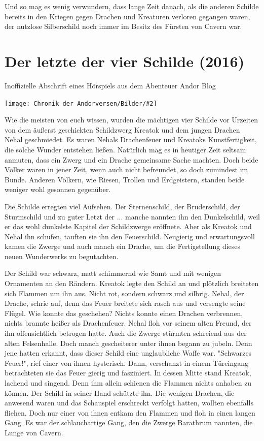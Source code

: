 \documentclass[10pt, a4paper, oneside]{book}
\newcommand{\fillbreak}{\vspace*{\fill}\columnbreak}
\newcommand{\storytext}[1]{%
    \section{#1}%
    \label{Storytext: #1}%
}
\newcommand{\bildmitts}[2][height=0.32\textwidth,width=0.48\textwidth,keepaspectratio]{%
    \begin{center}
        \texttt{[image: Chronik der Andorversen/Bilder/\#2]}
    \end{center}
}
\begin{document}
\begin{multicols}{2}
Und so mag es wenig verwundern, dass lange Zeit danach, als die anderen Schilde bereits in den Kriegen gegen Drachen und Kreaturen verloren gegangen waren, der nutzlose Silberschild noch immer im Besitz des Fürsten von Cavern war.




\fillbreak
\storytext{Der letzte der vier Schilde (2016)}

\begin{center}
    Inoffizielle Abschrift eines Hörspiels aus dem Abenteuer Andor Blog
\end{center}

\bildmitts{Kreatok und Nehal.jpeg}

Wie die meisten von euch wissen, wurden die mächtigen vier Schilde vor Urzeiten von dem äußerst geschickten Schildzwerg Kreatok und dem jungen Drachen Nehal geschmiedet. Es waren Nehals Drachenfeuer und Kreatoks Kunstfertigkeit, die solche Wunder entstehen ließen. Natürlich mag es in heutiger Zeit seltsam anmuten, dass ein Zwerg und ein Drache gemeinsame Sache machten. Doch beide Völker waren in jener Zeit, wenn auch nicht befreundet, so doch zumindest im Bunde. Anderen Völkern, wie Riesen, Trollen und Erdgeistern, standen beide weniger wohl gesonnen gegenüber.

Die Schilde erregten viel Aufsehen. Der Sternenschild, der Bruderschild, der Sturmschild und zu guter Letzt der ... manche nannten ihn den Dunkelschild, weil er das wohl dunkelste Kapitel der Schildzwerge eröffnete. Aber als Kreatok und Nehal ihn schufen, tauften sie ihn den Feuerschild. Neugierig und erwartungsvoll kamen die Zwerge und auch manch ein Drache, um die Fertigstellung dieses neuen Wunderwerks zu begutachten. 

Der Schild war schwarz, matt schimmernd wie Samt und mit wenigen Ornamenten an den Rändern. Kreatok legte den Schild an und plötzlich breiteten sich Flammen um ihn aus. Nicht rot, sondern schwarz und silbrig. Nehal, der Drache, schrie auf, denn das Feuer breitete sich rasch aus und versengte seine Flügel. Wie konnte das geschehen? Nichts konnte einen Drachen verbrennen, nichts brannte heißer als Drachenfeuer. Nehal floh vor seinem alten Freund, der ihn offensichtlich betrogen hatte. Auch die Zwerge stürmten schreiend aus der alten Felsenhalle. Doch manch gescheiterer unter ihnen begann zu jubeln. Denn jene hatten erkannt, dass dieser Schild eine unglaubliche Waffe war. "Schwarzes Feuer!", rief einer von ihnen hysterisch. Dann, verschanzt in einem Türeingang betrachteten sie das Feuer gierig und fasziniert. In dessen Mitte stand Kreatok, lachend und singend. Denn ihm allein schienen die Flammen nichts anhaben zu können. Der Schild in seiner Hand schützte ihn. Die wenigen Drachen, die anwesend waren und das Schauspiel erschreckt verfolgt hatten, wollten ebenfalls fliehen. Doch nur einer von ihnen entkam den Flammen und floh in einen langen Gang. Es war der schlauchartige Gang, den die Zwerge Barathrum nannten, die Lunge von Cavern. 


\end{multicols}
\end{document}
